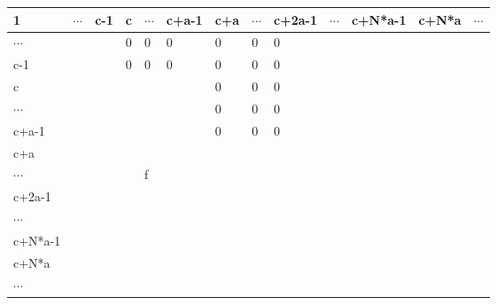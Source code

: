 \documentclass[a4paper,11pt]{article}
\begin{document}
\begin{center}
\begin{tabular}{p{15pt}|p{15pt}|p{15pt}||p{15pt}|p{15pt}
|p{15pt}||p{15pt}|p{15pt}|
p{15pt}|p{15pt}|p{15pt}|p{15pt}|p{15pt}| } 
 1 & $\cdots$ & c-1 & c & $\cdots$ & \tiny{c+a-1} & {\tiny c+a } 
& $\cdots$ & {\tiny{c+2a-1} }
& $\cdots$ & {\tiny c+N*a-1} & {\tiny c+N*a} & $\cdots$ \\
\hline
$\cdots$  & \cellcolor{green} & \cellcolor{green} & \cellcolor{sandstorm} 0 & \cellcolor{sandstorm} 0 & \cellcolor{sandstorm} 0 & \cellcolor{sandstorm} 0 & \cellcolor{sandstorm} 0 & \cellcolor{sandstorm} 0 &  &  &  & \\[10pt]
\hline
c-1 & \cellcolor{green} & \cellcolor{green} & \cellcolor{sandstorm} 0 & \cellcolor{sandstorm} 0 & \cellcolor{sandstorm} 0 & \cellcolor{sandstorm} 0 &\cellcolor{sandstorm} 0 & \cellcolor{sandstorm} 0 &  &  &  &  \\ [10pt]
\hline
c & \cellcolor{periwinkle} & \cellcolor{periwinkle} & \cellcolor{pink} & \cellcolor{pink} &\cellcolor{pink} & \cellcolor{sandstorm} 0 &
\cellcolor{sandstorm} 0 &
\cellcolor{sandstorm} 0 &&&& \\ [10pt]
\hline
$\cdots$ & \cellcolor{periwinkle} & \cellcolor{periwinkle}
&\cellcolor{pink} &\cellcolor{pink}&\cellcolor{pink} &
\cellcolor{sandstorm} 0 & \cellcolor{sandstorm} 0 &
\cellcolor{sandstorm} 0 &&&& \\ [10pt]
\hline
c+a-1 &\cellcolor{periwinkle} &\cellcolor{periwinkle} & \cellcolor{pink} & \cellcolor{pink} & \cellcolor{pink} 
& \cellcolor{sandstorm} 0 & \cellcolor{sandstorm} 0 
& \cellcolor{sandstorm} 0 &&&& \\ [10pt]
\hline \hline
{\scriptsize c+a }  & \cellcolor{periwinkle} & \cellcolor{periwinkle} & \cellcolor{trueblue} &\cellcolor{trueblue}
& \cellcolor{trueblue}& \cellcolor{pink} 
&\cellcolor{pink} & \cellcolor{pink} & &&& \\ [10pt]
\hline
$\cdots$ &\cellcolor{periwinkle} &\cellcolor{periwinkle} & \cellcolor{trueblue}  & \cellcolor{trueblue} f & \cellcolor{trueblue} 
& \cellcolor{pink} & \cellcolor{pink} &\cellcolor{pink} 
&&&& \\ [10pt]
\hline
{\small c+2a-1 } &\cellcolor{periwinkle} & \cellcolor{periwinkle} & \cellcolor{trueblue} 
& \cellcolor{trueblue}  & \cellcolor{trueblue}
& \cellcolor{pink} & \cellcolor{pink} & \cellcolor{pink} 
&&&& \\ [10pt]
\hline
$\cdots$ & &&&&&&&&&&&  \\ [10pt]
\hline
{\tiny c+N*a-1 } & &&&&&&&&&&& \\ [10pt]
\hline
{\tiny c+N*a} & &&&&&&&&&&&\\ [10pt]
\hline
$\cdots$ & &&&&&&&&&&&\\ [10pt]
\hline
\end{tabular}
\end{center}
\end{document}
